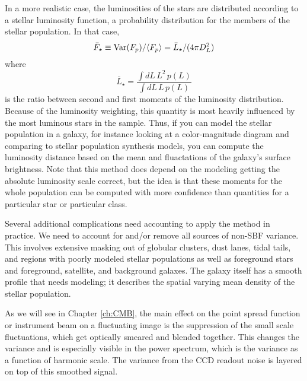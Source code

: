 In a more realistic case, the luminosities of the stars are distributed according to a stellar luminosity function, a probability distribution for the members of the stellar population.  In that case,
\begin{equation}
  \bar F_\star \equiv  {\rm Var}(F_p)/\langle F_p \rangle = \bar L_\star/(4\pi D_L^2)
\end{equation}
where
\begin{equation}
 \bar L_\star = \frac{\int dL\, L^2\, p(L)}{\int dL\, L\, p(L)}
\end{equation}
is the ratio between second and first moments of the luminosity distribution.  Because of the luminosity weighting, this quantity is most heavily influenced by the most luminous stars in the sample.  Thus, if you can model the stellar population in a galaxy, for instance looking at a color-magnitude diagram and comparing to stellar population synthesis models, you can compute the luminosity distance based on the mean and fluactations of the galaxy's surface brightness.  Note that this method does depend on the modeling getting the absolute luminosity scale correct, but the idea is that these moments for the whole population can be computed with more confidence than quantities for a particular star or particular class.

Several additional complications need accounting to apply the method in practice.  We need to account for and/or remove all sources of non-SBF variance.  This involves extensive masking out of globular clusters, dust lanes, tidal tails, and regions with poorly modeled stellar populations as well as foreground stars and foreground, satellite, and background galaxes.  The galaxy itself has a smooth profile that needs modeling; it describes the spatial varying mean density of the stellar population.

As we will see in Chapter \ref{ch:CMB}, the main effect on the point spread function or instrument beam on a fluctuating image is the suppression of the small scale fluctuations, which get optically smeared and blended together.  This changes the variance and is especially visible in the power spectrum, which is the variance as a function of harmonic scale.  The variance from the CCD readout noise is layered on top of this smoothed signal.


\exercises

